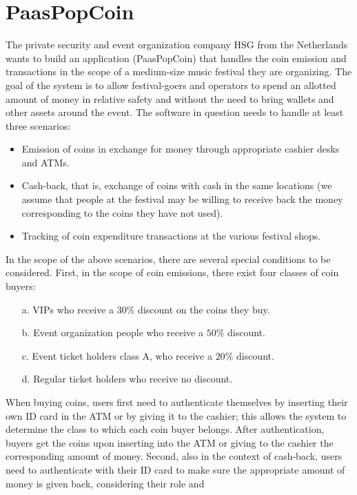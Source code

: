 \documentclass[12pt, a4paper]{report}
\begin{document}
    \section{PaasPopCoin}
        The private security and event organization company HSG from the Netherlands wants to build an application (PaasPopCoin) that handles the coin emission and transactions in 
        the scope of a medium-size music festival they are organizing. The goal of the system is to allow festival-goers and operators to spend an allotted amount of money in 
        relative safety and without the need to bring wallets and other assets around the event. The software in question needs to handle at least three scenarios:
        \begin{itemize}
            \item Emission of coins in exchange for money through appropriate cashier desks and ATMs.
            \item Cash-back, that is, exchange of coins with cash in the same locations (we assume that people at the festival may be willing to receive back the money corresponding
                to the coins they have not used).
            \item Tracking of coin expenditure transactions at the various festival shops.
        \end{itemize}
        In the scope of the above scenarios, there are several special conditions to be considered. First, in the scope of coin emissions, there exist four classes of coin buyers: 
        \begin{itemize}
            \item [a.] VIPs who receive a $30\%$ discount on the coins they buy. 
            \item [b.] Event organization people who receive a $50\%$ discount. 
            \item [c.] Event ticket holders class A, who receive a $20\%$ discount. 
            \item [d.] Regular ticket holders who receive no discount.
        \end{itemize}
        When buying coins, users first need to authenticate themselves by inserting their own ID card in the ATM or by giving it to the cashier; this allows the system to determine 
        the class to which each coin buyer belongs. After authentication, buyers get the coins upon inserting into the ATM or giving to the cashier the corresponding amount of money.
        Second, also in the context of cash-back, users need to authenticate with their ID card to make sure the appropriate amount of money is given back, considering their role and 
\end{document}
